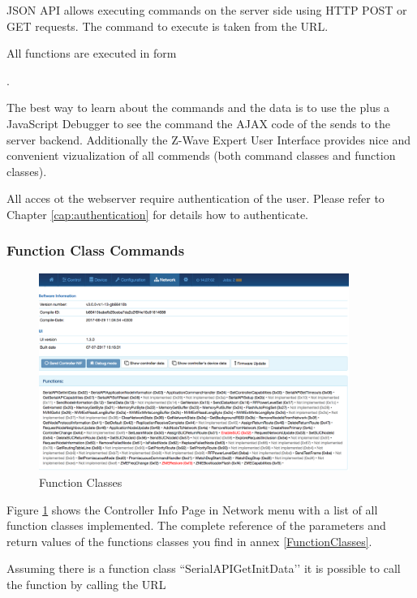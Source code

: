 JSON API allows executing commands on the server side using HTTP POST or GET requests. 
The command to execute is taken from the URL.

All functions are executed in form


.

The best way to learn about the commands and the data is to use the \zweui plus 
a JavaScript Debugger to see the command the AJAX code of the \zweui sends to the 
\zway server backend. Additionally the Z-Wave Expert User Interface provides nice and 
convenient vizualization of all commends (both command classes and function classes).

All acces ot the webserver require authentication of the user. Please refer to Chapter 
\ref{cap:authentication} for details how to authenticate.

\subsubsection{Function Class Commands}


\begin{figure}
\begin{center}
\includegraphics[width=0.9\textwidth]{pngs/cap11/dev3.png}
\caption{\zway Function Classes}
\label{dev3}
\end{center}
\end{figure}

Figure \ref{dev3} shows the Controller Info Page in Network menu with a list of all 
function classes implemented. The complete reference of the parameters and return 
values of the functions classes you find in annex \ref{FunctionClasses}.

Assuming there is a function class ``SerialAPIGetInitData’’ it is possible to call 
the function by calling the URL

